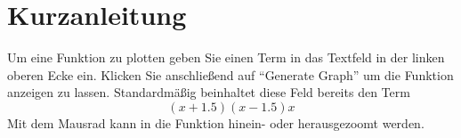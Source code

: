 \documentclass[12pt]{article}
\begin{document}
	\section*{Kurzanleitung}

	Um eine Funktion zu plotten geben Sie einen Term in das Textfeld in der linken oberen Ecke ein. Klicken Sie
	anschließend auf ``Generate Graph'' um die Funktion anzeigen zu lassen. Standardmäßig beinhaltet diese Feld
	bereits den Term 
	\[
		(x+1.5)(x-1.5)x
	\]
	Mit dem Mausrad kann in die Funktion hinein- oder herausgezoomt werden.
\end{document}
